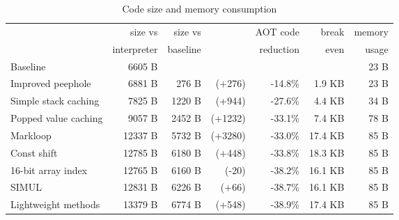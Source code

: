 
\begin{table}
\centering
\caption{Code size and memory consumption}
\label{tbl-code-size-and-memory-consumption}
    \begin{tabular}{lrrrrrr}
    \toprule
                              & size vs     & size vs  &                      & AOT code  &   break & memory    \\
                              & interpreter & baseline &                      & reduction &   even  & usage     \\
    \midrule
    \midrule
    Baseline                  &     6605 B  &          &                      &           &         & 23 B      \\
    Improved peephole         &     6881 B  &   276 B  & \scriptsize   (+276) &  -14.8\%  &  1.9 KB & 23 B      \\
    Simple stack caching      &     7825 B  &  1220 B  & \scriptsize   (+944) &  -27.6\%  &  4.4 KB & 34 B      \\
    Popped value caching      &     9057 B  &  2452 B  & \scriptsize  (+1232) &  -33.1\%  &  7.4 KB & 78 B      \\
    Markloop                  &    12337 B  &  5732 B  & \scriptsize  (+3280) &  -33.0\%  & 17.4 KB & 85 B      \\
    Const shift               &    12785 B  &  6180 B  & \scriptsize   (+448) &  -33.8\%  & 18.3 KB & 85 B      \\
    16-bit array index        &    12765 B  &  6160 B  & \scriptsize    (-20) &  -38.2\%  & 16.1 KB & 85 B      \\
    SIMUL                     &    12831 B  &  6226 B  & \scriptsize    (+66) &  -38.7\%  & 16.1 KB & 85 B      \\
    Lightweight methods       &    13379 B  &  6774 B  & \scriptsize   (+548) &  -38.9\%  & 17.4 KB & 85 B      \\
    \bottomrule
    \end{tabular}
\end{table}
